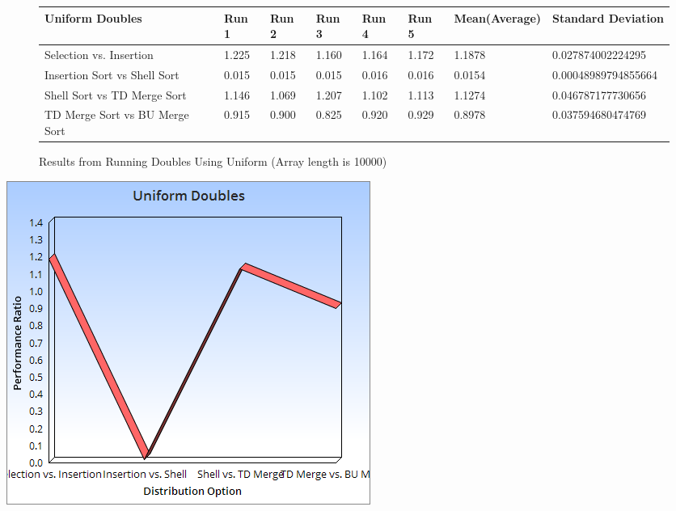 \documentclass{article}
\begin{document}
\begin{figure}[H]
\centering
\begin{adjustwidth}{-3.4cm}{}
\begin{tabular}{| l | l | l | l | l | l | l | l |}
\hline
Uniform Doubles & Run 1 & Run 2 & Run 3 & Run 4 & Run 5 & Mean(Average) & Standard Deviation\\ \hline
Selection vs. Insertion  & 1.225 & 1.218 & 1.160 & 1.164 & 1.172 & 1.1878 & 0.027874002224295  \\ \hline
Insertion Sort vs Shell Sort & 0.015 & 0.015 & 0.015 & 0.016 & 0.016 & 0.0154 & 0.00048989794855664  \\ \hline
Shell Sort vs TD Merge Sort & 1.146 & 1.069 & 1.207 & 1.102 & 1.113 & 1.1274 & 0.046787177730656 \\ \hline
TD Merge Sort vs BU Merge Sort & 0.915 &0.900 & 0.825 & 0.920 & 0.929 & 0.8978 & 0.037594680474769\\ \hline
\end{tabular}
\caption{Results from Running Doubles Using Uniform  (Array length is 10000)}
\end{adjustwidth}
\end{figure}
\includegraphics[scale=0.5]{UniformDoubles.png}
\end{document}
